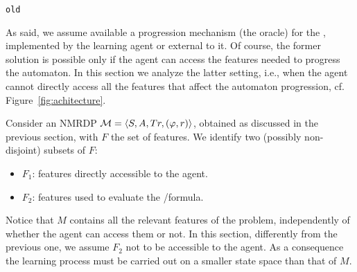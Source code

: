 



\bigskip
\texttt{old}

As said, we assume available a progression 
mechanism (the oracle) for the \DFA, 
implemented by the learning agent or external to it. 
Of course, the former solution is possible only if the agent can access the 
features needed to progress the automaton.
In this section we analyze the latter setting, i.e., when the agent
cannot directly access all the features that affect the automaton
progression, cf. Figure~\ref{fig:achitecture}.


Consider an NMRDP ${\cal M} = \langle S, A, Tr, (\varphi,r)\rangle$, 
obtained as discussed in the previous section, with $F$ the set of features.
We identify two (possibly non-disjoint) subsets of $F$:
\begin{itemize}
	\item $F_1$: features directly accessible to the agent. 
	\item $F_2$: features used to evaluate the \LTLf/\LDLf formula.
\end{itemize}
Notice that $M$ contains all the relevant features of the problem, 
independently of whether
the agent can access them or not. In this section, 
differently from the previous one, we assume $F_2$ not to be 
accessible to the agent. As a consequence  the learning 
process must  be carried out on a smaller state space than that 
of $M$. %


